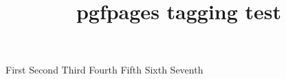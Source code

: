 \documentclass{article}
\title{pgfpages tagging test}
\begin{document}
First
\clearpage
Second
\clearpage
Third
\clearpage
Fourth
\clearpage
Fifth
\clearpage
Sixth
\clearpage
Seventh
\end{document}
